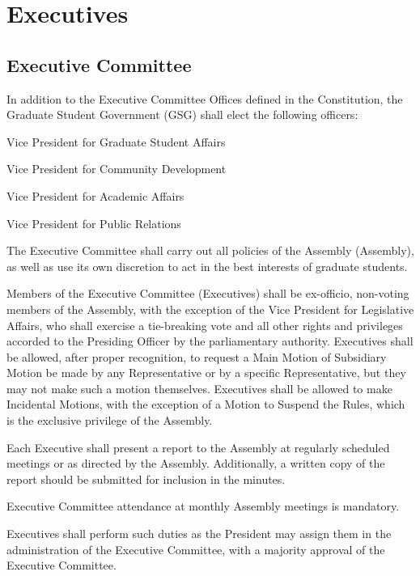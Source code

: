 \chapter{Executives}

\section{Executive Committee}
\begin{bylaws-number}
  \item In addition to the Executive Committee Offices defined in the Constitution, the Graduate Student Government (GSG) shall elect the following officers:
  \begin{bylaws-number}
    \item Vice President for Graduate Student Affairs
    \item Vice President for Community Development
    \item Vice President for Academic Affairs
    \item Vice President for Public Relations
  \end{bylaws-number}
  \item The Executive Committee shall carry out all policies of the Assembly (Assembly), as well as use its own discretion to act in the best interests of graduate students.
  \item Members of the Executive Committee (Executives) shall be ex-officio, non-voting members of the Assembly, with the exception of the Vice President for Legislative Affairs, who shall exercise a tie-breaking vote and all other rights and privileges accorded to the Presiding Officer by the parliamentary authority. Executives shall be allowed, after proper recognition, to request a Main Motion of Subsidiary Motion be made by any Representative or by a specific Representative, but they may not make such a motion themselves. Executives shall be allowed to make Incidental Motions, with the exception of a Motion to Suspend the Rules, which is the exclusive privilege of the Assembly.
  \item Each Executive shall present a report to the Assembly at regularly scheduled meetings or as directed by the Assembly. Additionally, a written copy of the report should be submitted for inclusion in the minutes.
  \item Executive Committee attendance at monthly Assembly meetings is mandatory.
  \item Executives shall perform such duties as the President may assign them in the administration of the Executive Committee, with a majority approval of the Executive Committee.

\end{bylaws-number}
